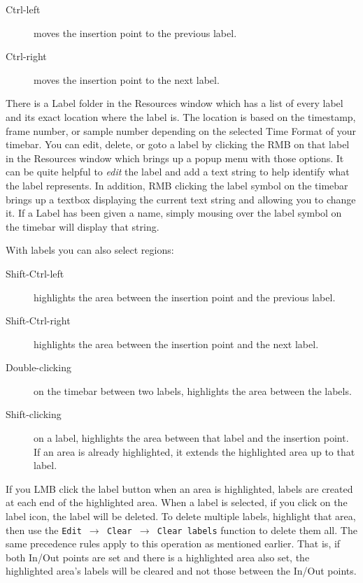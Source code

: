 \begin{description}
    \item[Ctrl-left] moves the insertion point to the previous label.
    \item[Ctrl-right] moves the insertion point to the next label.
\end{description}

There is a  Label folder in the Resources window which has a list of every label and its exact location
where the label is. The location is based on the timestamp, frame number, or sample number depending on the selected Time Format of your timebar. 
You can edit, delete, or goto a label by clicking the RMB on that label in the Resources window which
brings up a popup menu with those options.  It can be quite helpful to \textit{edit} the label
and add a text string to help identify what the label represents.
In addition, RMB clicking the label symbol on the timebar brings up a textbox displaying the current
text string and allowing you to change it. If a Label has been given a name, simply mousing over
the label symbol on the timebar will display that string.

With labels you can also select regions:

\begin{description}
    \item[Shift-Ctrl-left] highlights the area between the insertion point and the previous label.
    \item[Shift-Ctrl-right] highlights the area between the insertion point and the next label.
    \item[Double-clicking] on the timebar between two labels, highlights the area between the labels.	   
    \item[Shift-clicking] on a label, highlights the area between that label and the insertion point.
        If an area is already highlighted, it extends the highlighted area up to that label.
\end{description}

If you LMB click the label button when an area is highlighted, labels are created at each end of the
highlighted area. 
When a label is selected, if you click on the label icon, the label will be deleted. 
To delete multiple labels, highlight that area, then use the \texttt{Edit $\rightarrow$ Clear $\rightarrow$ Clear labels}
function to delete them all. The same precedence rules apply to this operation as mentioned earlier.  That
is, if both In/Out points are set and there is a highlighted area also set, the highlighted area's 
labels will be cleared and not those between the In/Out points.

